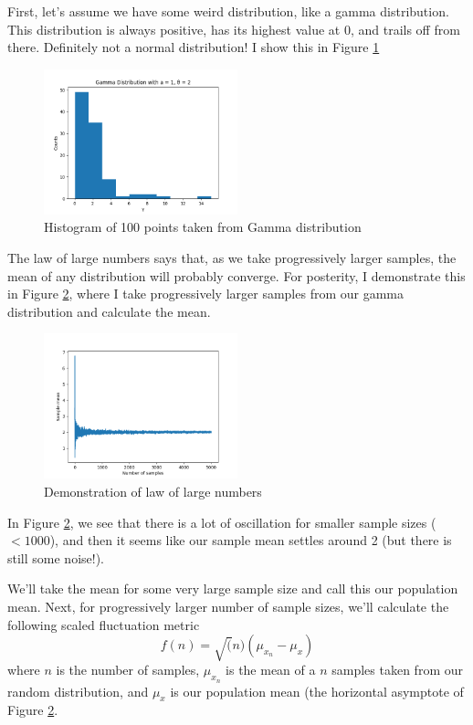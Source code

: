 \documentclass{article}
\begin{document}
First, let's assume we have some weird distribution, like a gamma distribution. This distribution is always positive, has its highest value at 0, and trails off from there. Definitely not a normal distribution! I show this in Figure \ref{fig:gamma}

\begin{figure}[htbp]
\centerline{\includegraphics[width = 0.5\textwidth]{gamma.png}}
\caption[]{\label{fig:gamma} Histogram of 100 points taken from Gamma distribution}
\end{figure}

The law of large numbers says that, as we take progressively larger samples, the mean of any distribution will probably converge. For posterity, I demonstrate this in Figure \ref{fig:lawoflarge}, where I take progressively larger samples from our gamma distribution and calculate the mean.

\begin{figure}[htbp]
\centerline{\includegraphics[width = 0.5\textwidth]{lawoflarge.png}}
\caption[]{\label{fig:lawoflarge} Demonstration of law of large numbers}
\end{figure}
In Figure \ref{fig:lawoflarge}, we see that there is a lot of oscillation for smaller sample sizes ($<1000$), and then it seems like our sample mean settles around 2 (but there is still some noise!).

We'll take the mean for some very large sample size and call this our population mean. Next, for progressively larger number of sample sizes, we'll calculate the following scaled fluctuation metric
\begin{equation}
\label{eq:14}
f(n) = \sqrt(n)(\mu_{x_n} - \mu_{x})
\end{equation}
where $n$ is the number of samples, $\mu_{x_n}$ is the mean of a $n$ samples taken from our random distribution, and $\mu_x$ is our population mean (the horizontal asymptote of Figure \ref{fig:lawoflarge}.
\end{document}
